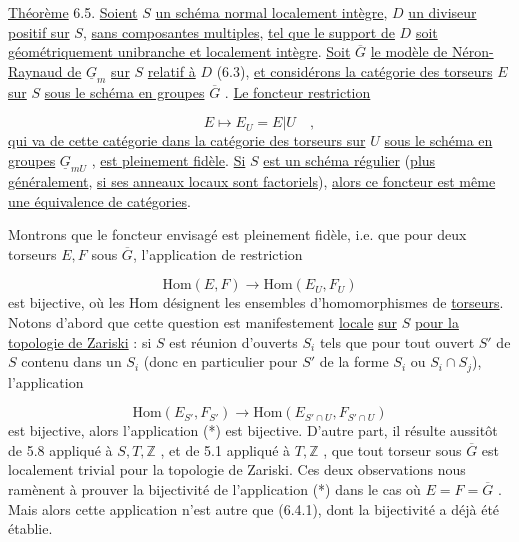 \underline{Théorème} 6.5. \underline{Soient} $S$ \underline{un schéma normal localement intègre}, $D$ \underline{un diviseur positif sur} $S$, \underline{sans composantes multiples}, \underline{tel que le support de} $D$ \underline{soit géométriquement unibranche et localement intègre}. \underline{Soit} $\overline{G}$ \underline{le modèle de Néron-Raynaud de} $\underline{G}_m$ \underline{sur} $S$ \underline{relatif à} $D$ (6.3), \underline{et considérons la catégorie des torseurs} $E$ \underline{sur} $S$ \underline{sous le schéma en groupes} $\overline{G}$ . \underline{Le foncteur restriction}

\begin{equation*}
E \longmapsto E_U = E|U \quad ,
\end{equation*}
\underline{qui va de cette catégorie dans la catégorie des torseurs sur} $U$ \underline{sous le schéma en groupes} $\underline{G}_{mU}$ , \underline{est pleinement fidèle}. \underline{Si} $S$ \underline{est un schéma régulier} (\underline{plus généralement}, \underline{si ses anneaux locaux sont factoriels}), \underline{alors ce foncteur est même une équivalence de catégories}.



Montrons que le foncteur envisagé est pleinement fidèle, i.e. que pour deux torseurs $E,F$ sous $\overline{G}$, l'application de restriction

\begin{equation}\tag{*}
\mathrm{Hom}(E,F) \longrightarrow \mathrm{Hom}(E_U,F_U)
\end{equation}
est bijective, où les Hom désignent les ensembles d'homomorphismes de \underline{torseurs}. Notons d'abord que cette question est manifestement \underline{locale} \underline{sur} $S$ \underline{pour la topologie de Zariski} : si $S$ est réunion d'ouverts $S_i$ tels que pour tout ouvert $S'$ de $S$ contenu dans un $S_i$ (donc en particulier pour $S'$ de la forme $S_i$ ou $S_i \cap S_j$), l'application

\begin{equation*}
\mathrm{Hom}(E_{S'},F_{S'}) \longrightarrow \mathrm{Hom}(E_{S' \cap U},F_{S' \cap U})
\end{equation*}
est bijective, alors l'application (*) est bijective. D'autre part, il résulte aussitôt de 5.8 appliqué à $S,T,\mathbb{Z}$ , et de 5.1 appliqué à $T,\mathbb{Z}$ , que tout torseur sous $\overline{G}$ est localement trivial pour la topologie de Zariski. Ces deux observations nous ramènent à prouver la bijectivité de l'application (*) dans le cas où $E=F=\overline{G}$ . Mais alors cette application n'est autre que (6.4.1), dont la bijectivité a déjà été établie.

